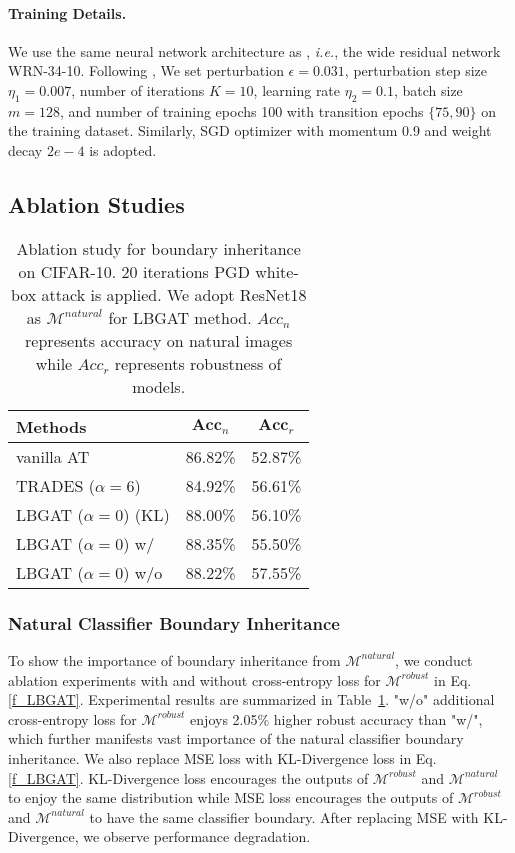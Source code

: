 \documentclass[10pt,twocolumn,letterpaper]{article}
\begin{document}
\paragraph{Training Details.}
We use the same neural network architecture as \cite{zhang2019theoretically}, {\it i.e.}, the wide residual network WRN-34-10. Following \cite{zhang2019theoretically}, We set perturbation $\epsilon = 0.031$, perturbation step size $\eta_{1} = 0.007$, number of iterations $K = 10$, learning rate $\eta_{2} = 0.1$, batch size $m = 128$, and number of training epochs 100 with transition epochs $\{75,90\}$ on the training dataset. Similarly, SGD optimizer with momentum 0.9 and weight decay $2e-4$ is adopted.

\subsection{Ablation Studies}

\begin{table}
	\centering
	\caption{Ablation study for boundary inheritance on CIFAR-10. 20 iterations PGD white-box attack is applied. We adopt ResNet18 as $\mathcal{M}^{natural}$ for LBGAT method. $Acc_{n}$ represents accuracy on natural images while $Acc_{r}$ represents robustness of models.} 
	\resizebox{0.80\linewidth}{!}
	{
		\begin{tabular}{l|c|c}
			\textbf{Methods} &$\textbf{Acc}_{n}$ &$\textbf{Acc}_{r}$ \\
			\hline
			\hline
			vanilla AT          &86.82\% &52.87\% \\
			TRADES ($\alpha=6$) &84.92\% &56.61\% \\
			LBGAT ($\alpha=0$) (KL)        &88.00\%  &56.10\% \\
			LBGAT ($\alpha=0$) w/          &88.35\% &55.50\% \\
			LBGAT ($\alpha=0$) w/o         &88.22\% &57.55\% \\
			\hline
			\hline
		\end{tabular}
		\label{tab:ablation_boundary_inheritance}
	}
\end{table}

\subsubsection{Natural Classifier Boundary Inheritance}
\label{sec:L_function}
To show the importance of boundary inheritance from $\mathcal{M}^{natural}$, we conduct ablation experiments with and without cross-entropy loss for $\mathcal{M}^{robust}$ in Eq. \eqref{f_LBGAT}. Experimental results are summarized in Table~\ref{tab:ablation_boundary_inheritance}. "w/o" additional cross-entropy loss for $\mathcal{M}^{robust}$ enjoys 2.05\% higher robust accuracy than "w/", which further manifests vast importance of the natural classifier boundary inheritance.  We also replace MSE loss with KL-Divergence loss in Eq. \eqref{f_LBGAT}. KL-Divergence loss encourages the outputs of $\mathcal{M}^{robust}$ and
$\mathcal{M}^{natural}$ to enjoy the same distribution while MSE loss encourages the outputs of $\mathcal{M}^{robust}$ and $\mathcal{M}^{natural}$ to have the same classifier boundary. After replacing MSE with KL-Divergence, we observe performance degradation.
\end{document}
